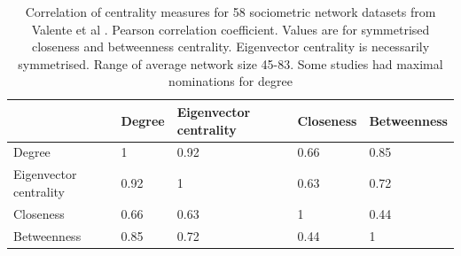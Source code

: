 \begin{table}[]
    \centering
    \begin{tabular}{lllll}
    \toprule
          & Degree & Eigenvector centrality & Closeness & Betweenness \\
         \midrule
    Degree  & 1  & 0.92  & 0.66 & 0.85\\
    Eigenvector centrality & 0.92 & 1 & 0.63 & 0.72  \\
    Closeness & 0.66 & 0.63 & 1 & 0.44  \\
    Betweenness& 0.85 & 0.72 & 0.44 & 1 \\
    \bottomrule
    \end{tabular}
    \caption{Correlation of centrality measures for 58 sociometric network datasets from Valente et al \cite{valente2008correlated}. Pearson correlation coefficient. Values are for symmetrised closeness and betweenness centrality. Eigenvector centrality is necessarily symmetrised. Range of average network size 45-83. Some studies had maximal nominations for degree}
    \label{tab:Correlation of centrality valente et al}
\end{table}

